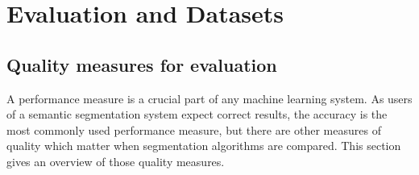 \documentclass[technote,a4paper,leqno]{IEEEtran}
\begin{document}
\section{Evaluation and Datasets}\label{sec:evaluation-and-datasets}
\subsection{Quality measures for evaluation}%
\label{subsec:quality-measures}%
A performance measure is a crucial part of any machine learning system. As
users of a semantic segmentation system expect correct results, the accuracy is
the most commonly used performance measure, but there are other measures of
quality which matter when segmentation algorithms are compared. This section
gives an overview of those quality measures.
\end{document}
